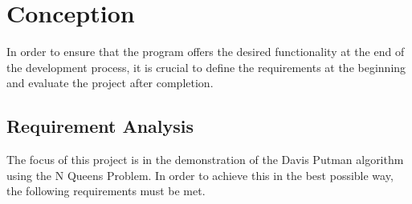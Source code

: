 \chapter{Conception}
\label{ch:conception}
In order to ensure that the program offers the desired functionality at the end of the development process, it is crucial to define the requirements at the beginning and evaluate the project after completion. 

\section{Requirement Analysis}
\label{sec:conAnalysis}
The focus of this project is in the demonstration of the Davis Putman algorithm using the N Queens Problem. In order to achieve this in the best possible way, the following requirements must be met. 


